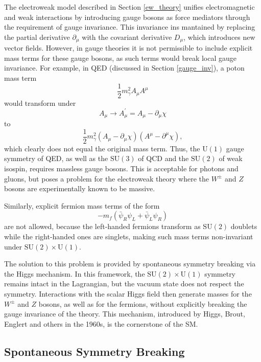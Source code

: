 The electroweak model described in Section \ref{ew_theory} unifies electromagnetic and weak interactions by introducing gauge bosons as force mediators through the requirement of gauge invariance. This invariance ins mantained by replacing the partial derivative $\partial_\mu$ with the covariant derivative $D_\mu$, which introduces new vector fields. However, in gauge theories it is not permissible to include explicit mass terms for these gauge bosons, as such terms would break local gauge invariance. For example, in QED (discussed in Section \ref{gauge_inv}), a poton mass term
\begin{equation}
\frac{1}{2}m_\gamma^2 A_\mu A^\mu
\end{equation}
would transform under
\begin{equation}
A_\mu \to A_\mu^\prime = A_\mu - \partial_\mu \chi
\end{equation}
to
\begin{equation}
\frac{1}{2} m_\gamma^2 (A_\mu - \partial_\mu \chi)(A^\mu - \partial^\mu \chi),
\end{equation}
which clearly does not equal the original mass term. Thus, the $\mathrm{U}(1)$ gauge symmetry of QED, as well as the $\mathrm{SU}(3)$ of QCD and the $\mathrm{SU}(2)$ of weak isospin, requires massless gauge bosons. This is acceptable for photons and gluons, but poses a problem for the electroweak theory where the $W^\pm$ and $Z$ bosons are experimentally known to be massive.

Similarly, explicit fermion mass terms of the form
\begin{equation}
-m_f (\bar{\psi}_R\psi_L + \bar{\psi}_L \psi_R)
\end{equation}
are not allowed, because the left-handed fermions transform as $\mathrm{SU}(2)$ doublets while the right-handed ones are singlets, making such mass terms non-invariant under $\mathrm{SU}(2)\times \mathrm{U}(1)$.

The solution to this problem is provided by spontaneous symmetry breaking via the Higgs mechanism. In this framework, the $\mathrm{SU}(2)\times \mathrm{U}(1)$ symmetry remains intact in the Lagrangian, but the vacuum state does not respect the symmetry. Interactions with the scalar Higgs field then generate masses for the $W^\pm$ and $Z$ bosons, as well as for the fermions, without explicitly breaking the gauge invariance of the theory. This mechanism, introduced by Higgs, Brout, Englert and others in the 1960s, is the cornerstone of the SM.


\subsection{Spontaneous Symmetry Breaking}


